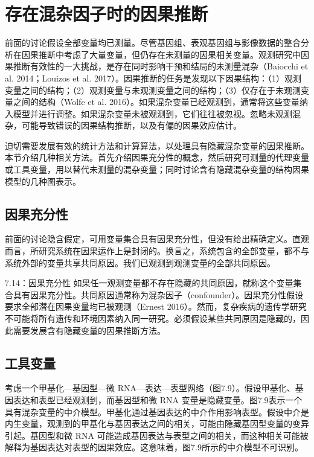 \section{存在混杂因子时的因果推断}

前面的讨论假设全部变量均已测量。尽管基因组、表观基因组与影像数据的整合分析在因果推断中考虑了大量变量，但仍存在未测量的因果相关变量。观测研究中因果推断有效性的一大挑战，是存在同时影响干预和结局的未测量混杂（Baiocchi et al. 2014；Louizos et al. 2017）。因果推断的任务是发现以下因果结构：（1）观测变量之间的结构；（2）观测变量与未观测变量之间的结构；（3）仅存在于未观测变量之间的结构（Wolfe et al. 2016）。如果混杂变量已经观测到，通常将这些变量纳入模型并进行调整。如果混杂变量未被观测到，它们往往被忽视。忽略未观测混杂，可能导致错误的因果结构推断，以及有偏的因果效应估计。

迫切需要发展有效的统计方法和计算算法，以处理具有隐藏混杂变量的因果推断。本节介绍几种相关方法。首先介绍因果充分性的概念，然后研究可测量的代理变量或工具变量，用以替代未测量的混杂变量；同时讨论含有隐藏混杂变量的结构因果模型的几种图表示。

\subsection{因果充分性}

前面的讨论隐含假定，可用变量集合具有因果充分性，但没有给出精确定义。直观而言，所研究系统在因果运作上是封闭的。换言之，系统包含的全部变量，都不与系统外部的变量共享共同原因。我们已观测到观测变量的全部共同原因。

\begin{bookdefinition}{7.14：因果充分性}
如果任一观测变量都不存在隐藏的共同原因，就称这个变量集合具有因果充分性。共同原因通常称为混杂因子（confounder）。因果充分性假设要求全部潜在因果变量均已被观测（Ernest 2016）。然而，复杂疾病的遗传学研究不可能将所有遗传和环境因素纳入同一研究。必须假设某些共同原因是隐藏的，因此需要发展含有隐藏变量的因果推断方法。
\end{bookdefinition}

\subsection{工具变量}

考虑一个甲基化—基因型—微 RNA—表达—表型网络（图7.9）。假设甲基化、基因表达和表型已经观测到，而基因型和微 RNA 变量是隐藏变量。图7.9表示一个具有混杂变量的中介模型。甲基化通过基因表达的中介作用影响表型。假设中介是内生变量，观测到的甲基化与基因表达之间的相关，可能由隐藏基因型变量的变异引起。基因型和微 RNA 可能造成基因表达与表型之间的相关，而这种相关可能被解释为基因表达对表型的因果效应。这意味着，图7.9所示的中介模型不可识别。

